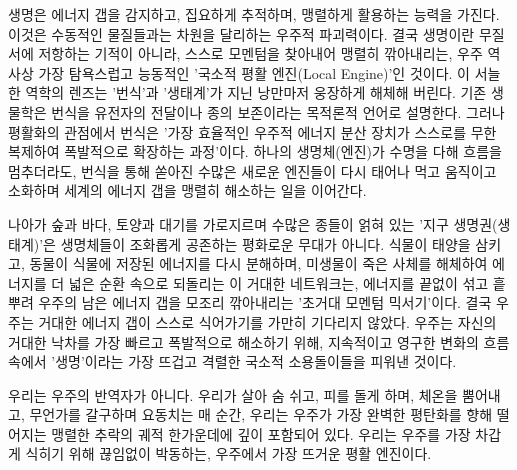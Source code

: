 생명은 에너지 갭을 감지하고, 집요하게 추적하며, 맹렬하게 활용하는 능력을 가진다. 이것은 수동적인 물질들과는 차원을 달리하는 우주적 파괴력이다. 결국 생명이란 무질서에 저항하는 기적이 아니라, 스스로 모멘텀을 찾아내어 맹렬히 깎아내리는, 우주 역사상 가장 탐욕스럽고 능동적인 '국소적 평활 엔진(Local Engine)'인 것이다.
이 서늘한 역학의 렌즈는 '번식'과 '생태계'가 지닌 낭만마저 웅장하게 해체해 버린다. 기존 생물학은 번식을 유전자의 전달이나 종의 보존이라는 목적론적 언어로 설명한다. 그러나 평활화의 관점에서 번식은 '가장 효율적인 우주적 에너지 분산 장치가 스스로를 무한 복제하여 폭발적으로 확장하는 과정'이다. 하나의 생명체(엔진)가 수명을 다해 흐름을 멈추더라도, 번식을 통해 쏟아진 수많은 새로운 엔진들이 다시 태어나 먹고 움직이고 소화하며 세계의 에너지 갭을 맹렬히 해소하는 일을 이어간다.

나아가 숲과 바다, 토양과 대기를 가로지르며 수많은 종들이 얽혀 있는 '지구 생명권(생태계)'은 생명체들이 조화롭게 공존하는 평화로운 무대가 아니다. 식물이 태양을 삼키고, 동물이 식물에 저장된 에너지를 다시 분해하며, 미생물이 죽은 사체를 해체하여 에너지를 더 넓은 순환 속으로 되돌리는 이 거대한 네트워크는, 에너지를 끝없이 섞고 흩뿌려 우주의 남은 에너지 갭을 모조리 깎아내리는 '초거대 모멘텀 믹서기'이다.
결국 우주는 거대한 에너지 갭이 스스로 식어가기를 가만히 기다리지 않았다. 우주는 자신의 거대한 낙차를 가장 빠르고 폭발적으로 해소하기 위해, 지속적이고 영구한 변화의 흐름 속에서 '생명'이라는 가장 뜨겁고 격렬한 국소적 소용돌이들을 피워낸 것이다.

우리는 우주의 반역자가 아니다. 우리가 살아 숨 쉬고, 피를 돌게 하며, 체온을 뿜어내고, 무언가를 갈구하며 요동치는 매 순간, 우리는 우주가 가장 완벽한 평탄화를 향해 떨어지는 맹렬한 추락의 궤적 한가운데에 깊이 포함되어 있다. 우리는 우주를 가장 차갑게 식히기 위해 끊임없이 박동하는, 우주에서 가장 뜨거운 평활 엔진이다.
